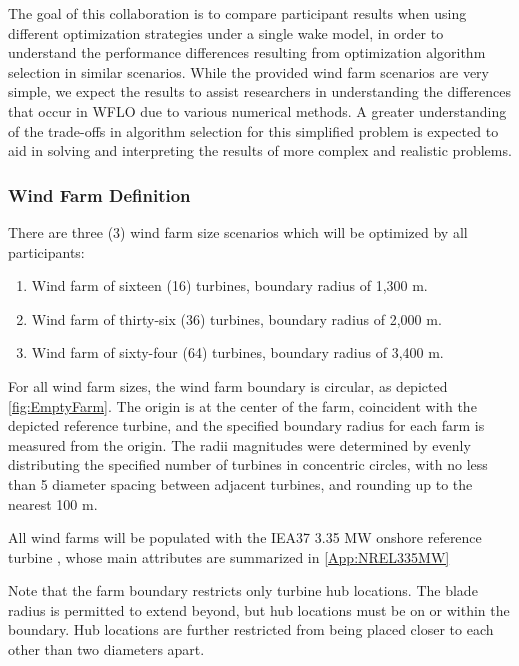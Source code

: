 \documentclass[12pt]{article}
\begin{document}
    The goal of this collaboration is to compare participant results when using different optimization strategies under a single wake model, in order to understand the performance differences resulting from optimization algorithm selection in similar scenarios. While the provided wind farm scenarios are very simple, we expect the results to assist researchers in understanding the differences that occur in WFLO due to various numerical methods. A greater understanding of the trade-offs in algorithm selection for this simplified problem is expected to aid in solving and interpreting the results of more complex and realistic problems.

\subsubsection{Wind Farm Definition}\label{Sec:OptWindFarm}
There are three (3) wind farm size scenarios which will be optimized by all participants:

        \begin{enumerate}
            \item Wind farm of sixteen (16) turbines,
                boundary radius of 1,300 m.
            \item Wind farm of thirty-six (36) turbines,
                boundary radius of 2,000 m.
            \item Wind farm of sixty-four (64) turbines,
                boundary radius of 3,400 m.
        \end{enumerate}
    
    For all wind farm sizes, the wind farm boundary is circular, as depicted \cref{fig:EmptyFarm}. The origin is at the center of the farm, coincident with the depicted reference turbine, and the specified boundary radius for each farm is measured from the origin. The radii magnitudes were determined by evenly distributing the specified number of turbines in concentric circles, with no less than 5 diameter spacing between adjacent turbines, and rounding up to the nearest 100 m.
    
    All wind farms will be populated with the IEA37 3.35 MW onshore reference turbine \cite{NREL335MW}, whose main attributes are summarized in \cref{App:NREL335MW}
    
    Note that the farm boundary restricts only turbine hub locations. The blade radius is permitted to extend beyond, but hub locations must be on or within the boundary. Hub locations are further restricted from being placed closer to each other than two diameters apart.
    
\end{document}
